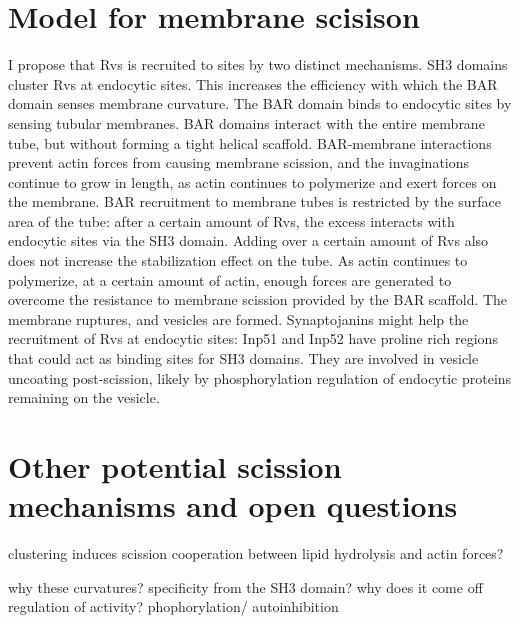 \section{Model for membrane scisison}
I propose that Rvs is recruited to sites by two distinct mechanisms. SH3 domains cluster Rvs at endocytic sites. This increases the efficiency with which the BAR domain senses membrane curvature. The BAR domain binds to endocytic sites by sensing tubular membranes. BAR domains interact with the entire membrane tube, but without forming a tight helical scaffold. BAR-membrane interactions prevent actin forces from causing membrane scission, and the invaginations continue to grow in length, as actin continues to polymerize and exert forces on the membrane. BAR recruitment to membrane tubes is restricted by the surface area of the tube: after a certain amount of Rvs, the excess interacts with endocytic sites via the SH3 domain. Adding over a certain amount of Rvs also does not increase the stabilization effect on the tube. As actin continues to polymerize, at a certain amount of actin, enough forces are generated to overcome the resistance to membrane scission provided by the BAR scaffold. The membrane ruptures, and vesicles are formed. Synaptojanins might help the recruitment of Rvs at endocytic sites: Inp51 and Inp52 have proline rich regions that could act as binding sites for SH3 domains. They are involved in vesicle uncoating post-scission, likely by phosphorylation regulation of endocytic proteins remaining on the vesicle. 


\section{Other potential scission mechanisms and open questions}

clustering induces scission 
cooperation between lipid hydrolysis and actin forces?


why these curvatures? specificity from the SH3 domain?
why does it come off
regulation of activity? phophorylation/ autoinhibition
